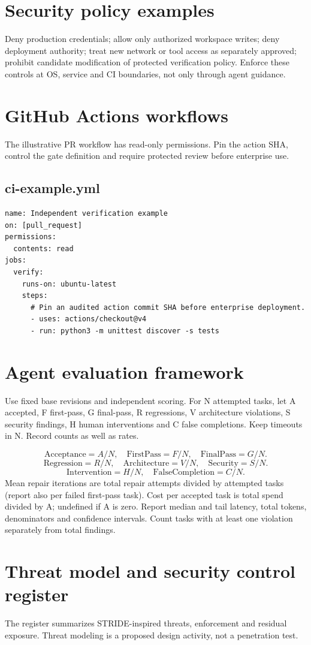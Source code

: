 \documentclass[11pt,letterpaper]{article}
\begin{document}
\clearpage\section{Security policy examples}
Deny production credentials; allow only authorized workspace writes; deny deployment authority; treat new network or tool access as separately approved; prohibit candidate modification of protected verification policy. Enforce these controls at OS, service and CI boundaries, not only through agent guidance.

\clearpage\section{GitHub Actions workflows}
The illustrative PR workflow has read-only permissions. Pin the action SHA, control the gate definition and require protected review before enterprise use.

\subsection*{ci-example.yml}
\begin{lstlisting}
name: Independent verification example
on: [pull_request]
permissions:
  contents: read
jobs:
  verify:
    runs-on: ubuntu-latest
    steps:
      # Pin an audited action commit SHA before enterprise deployment.
      - uses: actions/checkout@v4
      - run: python3 -m unittest discover -s tests
\end{lstlisting}
\clearpage\section{Agent evaluation framework}
Use fixed base revisions and independent scoring. For N attempted tasks, let A accepted, F first-pass, G final-pass, R regressions, V architecture violations, S security findings, H human interventions and C false completions. Keep timeouts in N. Record counts as well as rates.

\[
\mathrm{Acceptance}=A/N,\quad \mathrm{FirstPass}=F/N,\quad \mathrm{FinalPass}=G/N.
\]
\[
\mathrm{Regression}=R/N,\quad \mathrm{Architecture}=V/N,\quad \mathrm{Security}=S/N.
\]
\[
\mathrm{Intervention}=H/N,\quad \mathrm{FalseCompletion}=C/N.
\]
Mean repair iterations are total repair attempts divided by attempted tasks (report also per failed first-pass task). Cost per accepted task is total spend divided by A; undefined if A is zero. Report median and tail latency, total tokens, denominators and confidence intervals. Count tasks with at least one violation separately from total findings.
\clearpage\section{Threat model and security control register}
The register summarizes STRIDE-inspired threats, enforcement and residual exposure. Threat modeling is a proposed design activity, not a penetration test.
\end{document}
